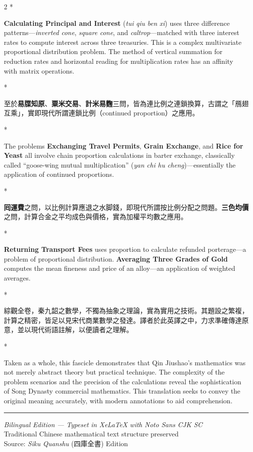 \documentclass[11pt,a4paper]{article}
\newcommand{\switchCn}{\switchcolumn[0]*}
\newcommand{\switchEn}{\switchcolumn[1]*}
\begin{document}
\begin{paracol}{2}
\switchEn

\textbf{Calculating Principal and Interest} (\textit{tui qiu ben xi}) uses three difference patterns---\textit{inverted cone}, \textit{square cone}, and \textit{caltrop}---matched with three interest rates to compute interest across three treasuries. This is a complex multivariate proportional distribution problem. The method of vertical summation for reduction rates and horizontal reading for multiplication rates has an affinity with matrix operations.

\switchCn

至於\textbf{易牒知原}、\textbf{粟米交易}、\textbf{計米易麴}三問，皆為連比例之連鎖換算，古謂之「鴈翅互乘」，實即現代所謂連鎖比例（continued proportion）之應用。

\switchEn

The problems \textbf{Exchanging Travel Permits}, \textbf{Grain Exchange}, and \textbf{Rice for Yeast} all involve chain proportion calculations in barter exchange, classically called ``goose-wing mutual multiplication'' (\textit{yan chi hu cheng})---essentially the application of continued proportions.

\switchCn

\textbf{囘運費}之問，以比例計算應退之水脚錢，即現代所謂按比例分配之問題。\textbf{三色均價}之問，計算合金之平均成色與價格，實為加權平均數之應用。

\switchEn

\textbf{Returning Transport Fees} uses proportion to calculate refunded porterage---a problem of proportional distribution. \textbf{Averaging Three Grades of Gold} computes the mean fineness and price of an alloy---an application of weighted averages.

\switchCn

綜觀全卷，秦九韶之數學，不獨為抽象之理論，實為實用之技術。其題設之繁複，計算之精密，皆足以見宋代商業數學之發達。譯者於此英譯之中，力求準確傳達原意，並以現代術語註解，以便讀者之理解。

\switchEn

Taken as a whole, this fascicle demonstrates that Qin Jiushao's mathematics was not merely abstract theory but practical technique. The complexity of the problem scenarios and the precision of the calculations reveal the sophistication of Song Dynasty commercial mathematics. This translation seeks to convey the original meaning accurately, with modern annotations to aid comprehension.

\end{paracol}

\vspace{2em}
\begin{center}
\textcolor{rulecolor}{\rule{0.5\textwidth}{0.4pt}}

\vspace{1em}
{\small\color{sectioncolor}
\textit{Bilingual Edition --- Typeset in XeLaTeX with Noto Sans CJK SC}\\[0.5em]
Traditional Chinese mathematical text structure preserved\\[0.5em]
Source: \textit{Siku Quanshu} (四庫全書) Edition}
\end{center}
\end{document}
